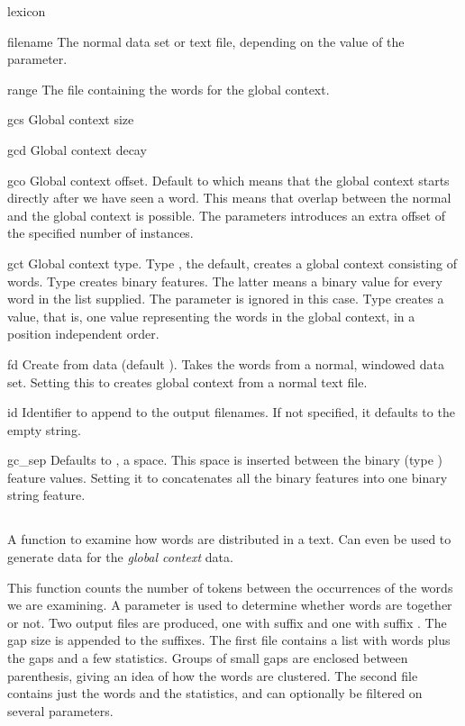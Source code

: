\documentclass[a4paper,10pt,twoside]{report}
\begin{document}
\begin{varlist}{lexicon}
\item[filename] The normal data set or text file, depending on the
  value of the  parameter.
\item[range] The file containing the words for the global context.
\item[gcs] Global context size
\item[gcd] Global context decay
\item[gco] Global context offset. Default to  which means that
  the global context starts directly after we have seen a word. This
  means that overlap between the normal and the global context is
  possible. The  parameters introduces an extra offset of the
  specified number of instances. 
\item[gct] Global context type. Type , the default, creates a
  global context consisting of words. Type  creates binary
  features. The latter means a binary value for every word in the
   list supplied. The  parameter is ignored in
  this case. Type  creates a  value, that is, one
  value representing the words in the global context, in a position
  independent order.
\item[fd] Create from data (default ). Takes the words from a
  normal, windowed data set. Setting this to  creates global
  context from a normal text file.
\item[id] Identifier to append to the output filenames. If not
  specified, it defaults to the empty string.
\item[gc\_sep] Defaults to , a space. This space is inserted
  between the binary (type ) feature values. Setting it to
   concatenates all the binary features into one binary string
  feature. 
\end{varlist}

\subsection{}

A function to examine how words are distributed in a text. Can even be
used to generate data for the \emph{global context} data.

This function counts the number of tokens between the occurrences of
the words we are examining. A  parameter is used to determine
whether words are  together or not. Two output files are
produced, one with suffix  and one with suffix . The
gap size is appended to the suffixes. The first file contains a list
with words plus the gaps and a few statistics. Groups of small gaps
are enclosed between parenthesis, giving an idea of how the words are
clustered. The second file contains just the words and the statistics,
and can optionally be filtered on several parameters.
\end{document}
